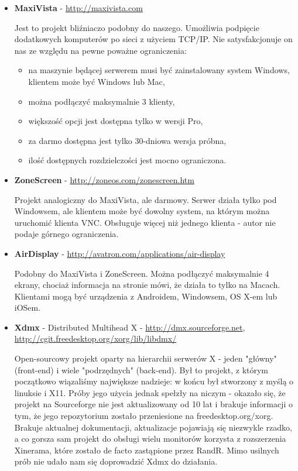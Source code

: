     \begin{itemize}
      \item \textbf{MaxiVista} - \url{http://maxivista.com}

        Jest to projekt bliźniaczo podobny do naszego. Umożliwia podpięcie dodatkowych komputerów po sieci z użyciem TCP/IP. Nie satysfakcjonuje on nas ze względu na pewne poważne ograniczenia:
        \begin{itemize}
          \item na maszynie będącej serwerem musi być zainstalowany system Windows, klientem może być Windows lub Mac,
          \item można podłączyć maksymalnie 3 klienty,
          \item większość opcji jest dostępna tylko w wersji Pro,
          \item za darmo dostępna jest tylko 30-dniowa wersja próbna,
          \item ilość dostępnych rozdzielczości jest mocno ograniczona.
        \end{itemize}

      \item \textbf{ZoneScreen} - \url{http://zoneos.com/zonescreen.htm}

        Projekt analogiczny do MaxiVista, ale darmowy. Serwer działa tylko pod Windowsem, ale klientem może być dowolny system, na którym można uruchomić klienta VNC. Obsługuje więcej niż jednego klienta - autor nie podaje górnego ograniczenia.

      \item \textbf{AirDisplay} - \url{http://avatron.com/applications/air-display}

        Podobny do MaxiVista i ZoneScreen. Można podłączyć maksymalnie 4 ekrany, chociaż informacja na stronie mówi, że działa to tylko na Macach. Klientami mogą być urządzenia z Androidem, Windowsem, OS X-em lub iOSem.

      \item \textbf{Xdmx} - Distributed Multihead X - \url{http://dmx.sourceforge.net}, \url{http://cgit.freedesktop.org/xorg/lib/libdmx/}

        Open-sourcowy projekt oparty na hierarchii serwerów X - jeden "główny" (front-end) i wiele "podrzędnych" (back-end). Był to projekt, z którym początkowo wiązaliśmy największe nadzieje: w końcu był stworzony z myślą o linuksie i X11. Próby jego użycia jednak spełzły na niczym - okazało się, że projekt na Sourceforge nie jest aktualizowany od 10 lat i brakuje informacji o tym, że jego repozytorium zostało przeniesione na freedesktop.org/xorg. Brakuje aktualnej dokumentacji, aktualizacje pojawiają się niezwykle rzadko, a co gorsza sam projekt do obsługi wielu monitorów korzysta z rozszerzenia Xinerama, które zostało de facto zastąpione przez RandR. Mimo usilnych prób nie udało nam się doprowadzić Xdmx do działania.


\end{itemize}

